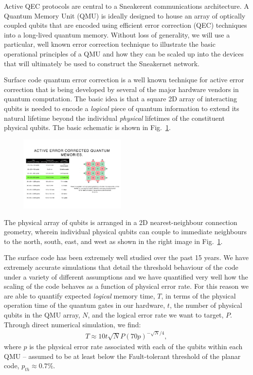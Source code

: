 \documentclass[twocolumn, aps, rmp, amsmath, amssymb, nofootinbib, superscriptaddress, longbibliography, floatfix, table-of-contents, eqsecnum]{revtex4-2}
\begin{document}
Active QEC protocols are central to a Sneakerent communications architecture. A Quantum Memory Unit (QMU) is ideally designed to house an array of optically coupled qubits that are encoded using efficient error correction (QEC) techniques into a long-lived quantum memory. Without loss of generality, we will use a particular, well known error correction technique to illustrate the basic operational principles of a QMU and how they can be scaled up into the devices that will ultimately be used to construct the Sneakernet network.

Surface code quantum error correction is a well known technique for active error correction that is being developed by several of the major hardware vendors in quantum computation. The basic idea is that a square 2D array of interacting qubits is needed to encode a \textit{logical} piece of quantum information to extend its natural lifetime beyond the individual \textit{physical} lifetimes of the constituent physical qubits. The basic schematic is shown in Fig.~\ref{fig:array}. 

\begin{figure}[htbp!]
	\includegraphics[clip=true, width=0.475\textwidth]{array}
	\caption{} \label{fig:array}
\end{figure}

The physical array of qubits is arranged in a 2D nearest-neighbour connection geometry, wherein individual physical qubits can couple to immediate neighbours to the north, south, east, and west as shown in the right image in Fig.~\ref{fig:array}. 

The surface code has been extremely well studied over the past 15 years. We have extremely accurate simulations that detail the threshold behaviour of the code under a variety of different assumptions and we have quantified very well how the scaling of the code behaves as a function of physical error rate. For this reason we are able to quantify expected \textit{logical} memory time, $T$, in terms of the physical operation time of the quantum gates in our hardware, $t$, the number of physical qubits in the QMU array, $N$, and the logical error rate we want to target, $P$. Through direct numerical simulation, we find:
\begin{align} \label{eq:scale}
T \approx 10t\sqrt{N} P(70p)^{-\sqrt{N}/4},
\end{align}
where $p$ is the physical error rate associated with each of the qubits within each QMU -- assumed to be at least below the Fault-tolerant threshold of the planar code, $p_{th} \approx 0.7\%$.
\end{document}
